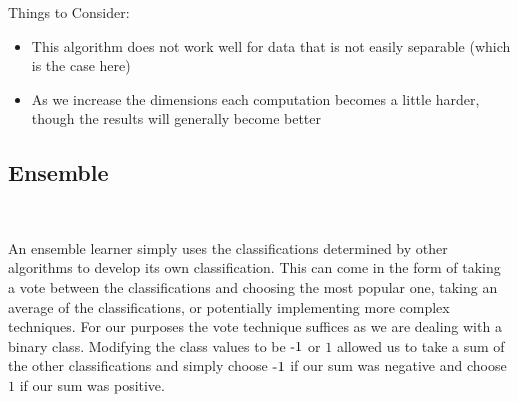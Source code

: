 \documentclass{article}
\begin{document}
		Things to Consider:
		\begin{itemize}
			\item This algorithm does not work well for data that is not easily separable (which is the case here)
			\item As we increase the dimensions each computation becomes a little harder, though the results will generally become better
		\end{itemize}		
		
		\subsection{Ensemble}~
		
		An ensemble learner simply uses the classifications determined by other algorithms to develop its own classification. This can come in the form of taking a vote between the classifications and choosing the most popular one, taking an average of the classifications, or potentially implementing more complex techniques. For our purposes the vote technique suffices as we are dealing with a binary class. Modifying the class values to be $ \text-1 $ or $ 1 $ allowed us to take a sum of the other classifications and simply choose $ \text-1 $ if our sum was negative and choose $ 1 $ if our sum was positive.\\
		
\end{document}
